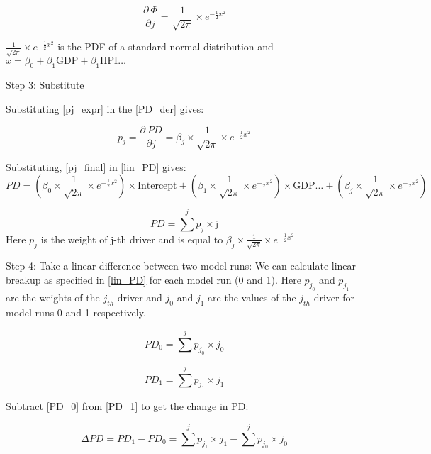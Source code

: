 \documentclass{article}
\numberwithin{equation}{section}
\begin{document}
\begin{equation} \label{pj_expr} \frac{\partial \ \Phi}{\partial j} = \frac{1}{\sqrt{2 \pi}} \times e^{-\frac{1}{2} x^2} \end{equation} 

$ \frac{1}{\sqrt{2 \pi}} \times e^{-\frac{1}{2} x^2} $ is the PDF of a standard normal distribution and $x = \beta_0 + \beta_1 \text{GDP} + \beta_1 \text{HPI} \hdots $

Step 3: Substitute

Substituting \ref{pj_expr} in the \ref{PD_der} gives:

\begin{equation} 
\label{pj_final}
p_j = \frac{\partial \ PD}{\partial j} = \beta_j \times \frac{1}{\sqrt{2 \pi}} \times e^{-\frac{1}{2} x^2}
\end{equation}

Substituting, \ref{pj_final} in \ref{lin_PD} gives:
\begin{equation} 
\label{lin_PD_final}
PD = \left(\beta_0 \times \frac{1}{\sqrt{2 \pi}} \times e^{-\frac{1}{2} x^2} \right) \times \text{Intercept}  + \left(\beta_1 \times \frac{1}{\sqrt{2 \pi}} \times e^{-\frac{1}{2} x^2} \right) \times \text{GDP} \hdots + \left(\beta_j \times \frac{1}{\sqrt{2 \pi}} \times e^{-\frac{1}{2} x^2}\right)
\end{equation}

$$ PD = \sum^j p_j \times \text{j} $$
Here $p_j$ is the weight of j-th driver and is equal to $\beta_j \times \frac{1}{\sqrt{2 \pi}} \times e^{-\frac{1}{2} x^2}$

Step 4: Take a linear difference between two model runs:
We can calculate linear breakup as specified in \ref{lin_PD} for each model run (0 and 1). Here $p_{j_0}$ and $p_{j_1}$ are the weights of the $j_{th}$ driver and ${j_0}$ and ${j_1}$ are the values of the $j_{th}$ driver for model runs 0 and 1 respectively.


\begin{equation}
\label{PD_0}
PD_0 = \sum^j p_{j_0} \times j_0
\end{equation}

\begin{equation}
  \label{PD_1}
  PD_1 = \sum^j p_{j_1} \times j_1 \end{equation}

Subtract \ref{PD_0} from \ref{PD_1} to get the change in PD:

\begin{equation}
\label{PD_diff}
\Delta PD = PD_1 - PD_0 = \sum^j p_{j_1} \times j_1 - \sum^j p_{j_0} \times j_0
\end{equation}
\end{document}
